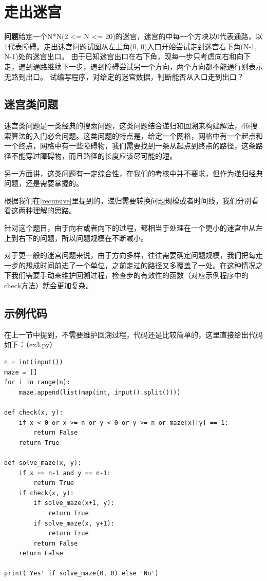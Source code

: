 \documentclass{article}
\begin{document}
\section{走出迷宫}
\textbf{问题}\quad 给定一个N*N(2 <= N <= 20)的迷宫，迷宫的中每一个方块以0代表通路，以1代表障碍。走出迷宫问题试图从左上角(0, 0)入口开始尝试走到迷宫右下角(N-1, N-1)处的迷宫出口。
由于已知迷宫出口在右下角，现每一步只考虑向右和向下走，遇到通路继续下一步，遇到障碍尝试另一个方向，两个方向都不能通行则表示无路到出口。
试编写程序，对给定的迷宫数据，判断能否从入口走到出口？

\subsection{迷宫类问题}

迷宫类问题是一类经典的搜索问题，这类问题结合递归和回溯来构建解法，dfs搜索算法的入门必会问题。这类问题的特点是，给定一个网格，网格中有一个起点和一个终点，网格中有一些障碍物，我们需要找到一条从起点到终点的路径，这条路径不能穿过障碍物，而且路径的长度应该尽可能的短。

另一方面讲，这类问题有一定综合性，在我们的考核中并不要求，但作为递归经典问题，还是需要掌握的。

根据我们在\ref{recursive}里提到的，递归需要转换问题规模或者时间线，我们分别看看这两种理解的思路。


针对这个题目，由于向右或者向下的过程，都相当于处理在一个更小的迷宫中从左上到右下的问题，所以问题规模在不断减小。

对于更一般的迷宫问题来说，由于方向多样，往往需要确定问题规模，我们把每走一步的想成时间前进了一个单位，之前走过的路径又多覆盖了一处。在这种情况之下我们需要手动来维护回溯过程，检查步的有效性的函数（对应示例程序中的check方法）就会更加复杂。

\subsection{示例代码}

在上一节中提到，不需要维护回溯过程，代码还是比较简单的，这里直接给出代码如下：（ex3.py）

\begin{lstlisting}
n = int(input())
maze = []
for i in range(n):
    maze.append(list(map(int, input().split())))

def check(x, y):
    if x < 0 or x >= n or y < 0 or y >= n or maze[x][y] == 1:
        return False
    return True

def solve_maze(x, y):
    if x == n-1 and y == n-1:
        return True
    if check(x, y):
        if solve_maze(x+1, y):
            return True
        if solve_maze(x, y+1):
            return True
        return False
    return False

print('Yes' if solve_maze(0, 0) else 'No')
\end{lstlisting}
\end{document}
